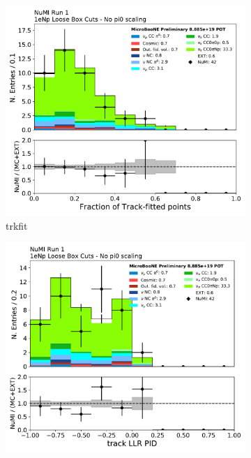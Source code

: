 \begin{figure}[H]
    \centering
    \begin{subfigure}{0.3\textwidth}
    \includegraphics[width=1.0\textwidth]{Sidebands/Figures/NuMI/1eNp/trkfit.pdf}
    \caption{trkfit}
    \end{subfigure}
    \begin{subfigure}{0.3\textwidth}
    \includegraphics[width=1.0\textwidth]{Sidebands/Figures/NuMI/1eNp/trkpid.pdf}

\end{subfigure}
\end{figure}
